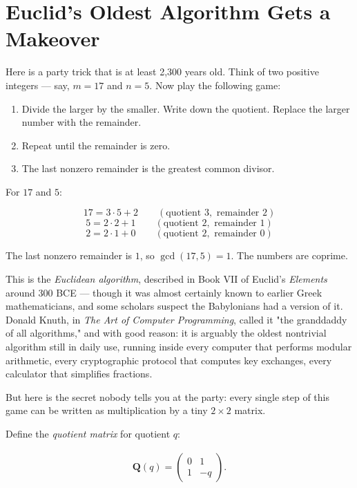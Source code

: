 \documentclass[11pt,twoside,openright]{book}
\theoremstyle{definition}
\theoremstyle{remark}
\begin{document}
\section{Euclid's Oldest Algorithm Gets a Makeover}

Here is a party trick that is at least 2,300 years old. Think of two positive integers --- say, $m = 17$ and $n = 5$. Now play the following game:

\begin{enumerate}
  \item Divide the larger by the smaller. Write down the quotient. Replace the larger number with the remainder.
  \item Repeat until the remainder is zero.
  \item The last nonzero remainder is the greatest common divisor.
\end{enumerate}

For $17$ and $5$:

\[17 = 3 \cdot 5 + 2 \qquad (\text{quotient } 3, \text{ remainder } 2)\]
\[5 = 2 \cdot 2 + 1 \qquad (\text{quotient } 2, \text{ remainder } 1)\]
\[2 = 2 \cdot 1 + 0 \qquad (\text{quotient } 2, \text{ remainder } 0)\]

The last nonzero remainder is $1$, so $\gcd(17, 5) = 1$. The numbers are coprime.

This is the \textit{Euclidean algorithm}, described in Book VII of Euclid's \textit{Elements} around 300 BCE --- though it was almost certainly known to earlier Greek mathematicians, and some scholars suspect the Babylonians had a version of it. Donald Knuth, in \textit{The Art of Computer Programming}, called it "the granddaddy of all algorithms," and with good reason: it is arguably the oldest nontrivial algorithm still in daily use, running inside every computer that performs modular arithmetic, every cryptographic protocol that computes key exchanges, every calculator that simplifies fractions.

But here is the secret nobody tells you at the party: every single step of this game can be written as multiplication by a tiny $2 \times 2$ matrix.

Define the \textit{quotient matrix} for quotient $q$:

\begin{align*}
\mathbf{Q}(q) = \begin{pmatrix} 0 & 1 \\ 1 & -q \end{pmatrix}.
\end{align*}
\end{document}

